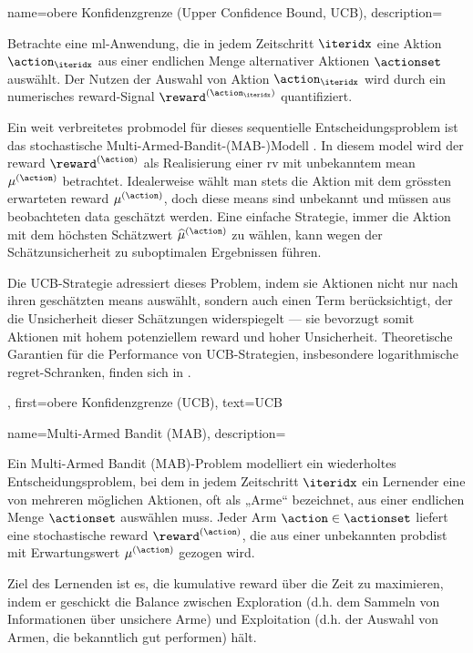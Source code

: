 {{
{
	name={obere Konfidenzgrenze (Upper Confidence Bound, UCB)},
	description={Betrachte eine  \gls{ml}-Anwendung, 
		die in jedem Zeitschritt $\iteridx$ eine Aktion $\action_{\iteridx}$ aus einer endlichen Menge 
		alternativer Aktionen $\actionset$ auswählt. Der Nutzen der Auswahl von Aktion 
		$\action_{\iteridx}$ wird durch ein numerisches \gls{reward}-Signal $\reward^{(\action_{\iteridx})}$ quantifiziert. 
		
		Ein weit verbreitetes \gls{probmodel} für dieses sequentielle Entscheidungsproblem 
		ist das stochastische Multi-Armed-Bandit-(MAB-)Modell \cite{Bubeck2012}. In diesem \gls{model} 
		wird der \gls{reward} $\reward^{(\action)}$ als Realisierung einer \gls{rv} mit unbekanntem 
		\gls{mean} $\mu^{(\action)}$ betrachtet. Idealerweise wählt man stets die Aktion mit dem 
		grössten erwarteten \gls{reward} $\mu^{(\action)}$, doch diese \gls{mean}s sind unbekannt 
		und müssen aus beobachteten \gls{data} geschätzt werden. Eine einfache Strategie, immer die Aktion 
		mit dem höchsten Schätzwert $\widehat{\mu}^{(\action)}$ zu wählen, kann wegen der 
		Schätzunsicherheit zu suboptimalen Ergebnissen führen. 
		
		Die UCB-Strategie adressiert dieses Problem, indem sie Aktionen nicht nur nach ihren geschätzten 
		\gls{mean}s auswählt, sondern auch einen Term berücksichtigt, der die Unsicherheit dieser 
		Schätzungen widerspiegelt — sie bevorzugt somit Aktionen mit hohem potenziellem \gls{reward} 
		und hoher Unsicherheit. Theoretische Garantien für die Performance von UCB-Strategien, 
		insbesondere logarithmische \gls{regret}-Schranken, finden sich in \cite{Bubeck2012}.},
	first={obere Konfidenzgrenze (UCB)}, text={UCB}
}

{
	name={Multi-Armed Bandit (MAB)},
	description={Ein Multi-Armed Bandit (MAB)-Problem modelliert ein wiederholtes Entscheidungsproblem, 
		bei dem in jedem Zeitschritt $\iteridx$ ein Lernender eine von mehreren möglichen Aktionen, oft als „Arme“ bezeichnet, aus einer endlichen Menge 
		$\actionset$ auswählen muss. Jeder Arm $\action \in \actionset$ liefert eine stochastische \gls{reward} $\reward^{(\action)}$, 
		die aus einer unbekannten \gls{probdist} mit Erwartungswert $\mu^{(\action)}$ gezogen wird. 
		
		Ziel des Lernenden ist es, die kumulative \gls{reward} über die Zeit zu maximieren, indem er geschickt die Balance zwischen Exploration 
		(d.h. dem Sammeln von Informationen über unsichere Arme) und Exploitation (d.h. der Auswahl von Armen, die bekanntlich gut performen) hält. 
		
}}}}
